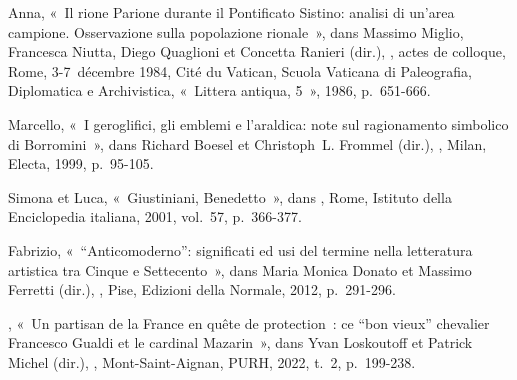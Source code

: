 \begin{teiElement}[name={TEI},change={commons\_edition}]
\begin{teiElement}[name={text},type={book},xmlid={book}]
\begin{teiElement}[name={group},type={book},xmlid={book-001}]
\begin{teiElement}[name={group},type={bibliography},data-page-title={Sources et bibliographie},data-include-href={Ch14\_Source\_bibliographie.xml},xmlid={bibliography-001}]
\begin{teiElement}[name={body}]
\begin{teiDiv}[type={section1},xmlid={div18}]
\begin{teiDiv}[type={section2},xmlid={div19}]
\begin{teiBibl}[xmlid={bibl-364}]
 Anna, « Il rione Parione durante il Pontificato Sistino: analisi di un’area campione. Osservazione sulla popolazione rionale », dans Massimo Miglio, Francesca Niutta, Diego Quaglioni et Concetta Ranieri (dir.), , actes de colloque, Rome, 3-7 décembre 1984, Cité du Vatican, Scuola Vaticana di Paleografia, Diplomatica e Archivistica, « Littera antiqua, 5 », 1986, p. 651-666.
\end{teiBibl}
              \begin{teiBibl}[xmlid={bibl-365}]
 Marcello, « I geroglifici, gli emblemi e l’araldica: note sul ragionamento simbolico di Borromini », dans Richard Boesel et Christoph L. Frommel (dir.), , Milan, Electa, 1999, p. 95-105.
\end{teiBibl}
              \begin{teiBibl}[xmlid={bibl-366}]
 Simona et  Luca, « Giustiniani, Benedetto », dans , Rome, Istituto della Enciclopedia italiana, 2001, vol. 57, p. 366-377.
\end{teiBibl}
              \begin{teiBibl}[xmlid={bibl-367}]
 Fabrizio, « “Anticomoderno”: significati ed usi del termine nella letteratura artistica tra Cinque e Settecento », dans Maria Monica Donato et Massimo Ferretti (dir.), , Pise, Edizioni della Normale, 2012, p. 291-296.
\end{teiBibl}
              \begin{teiBibl}[xmlid={bibl-368}]
, « Un partisan de la France en quête de protection : ce “bon vieux” chevalier Francesco Gualdi et le cardinal Mazarin », dans Yvan Loskoutoff et Patrick Michel (dir.), , Mont-Saint-Aignan, PURH, 2022, t. 2, p. 199-238.
\end{teiBibl}
              \begin{teiBibl}[xmlid={bibl-369}]

\end{teiBibl}
\end{teiDiv}
\end{teiDiv}
\end{teiElement}
\end{teiElement}
\end{teiElement}
\end{teiElement}
\end{teiElement}
